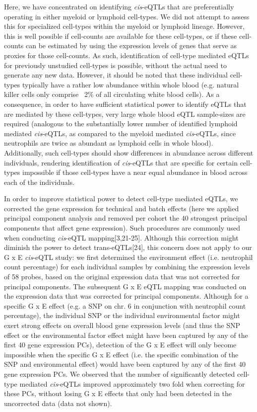   Here, we have concentrated on identifying \emph{cis}-eQTLs that are preferentially operating in either 
  myeloid or lymphoid cell-types. We did not attempt to assess this for specialized cell-types within 
  the myeloid or lymphoid lineage. However, this is well possible if cell-counts are available for 
  these cell-types, or if these cell-counts can be estimated by using the expression levels of genes 
  that serve as proxies for those cell-counts. As such, identification of cell-type mediated eQTLs 
  for previously unstudied cell-types is possible, without the actual need to generate any new data. 
  However, it should be noted that these individual cell-types typically have a rather low abundance 
  within whole blood (e.g. natural killer cells only comprise ~2\% of all circulating white blood 
  cells). As a consequence, in order to have sufficient statistical power to identify eQTLs that are 
  mediated by these cell-types, very large whole blood eQTL sample-sizes are required (analogous to 
  the substantially lower number of identified lymphoid mediated \emph{cis}-eQTLs, as compared to the myeloid 
  mediated \emph{cis}-eQTLs, since neutrophils are twice as abundant as lymphoid cells in whole blood). 
  Additionally, such cell-types should show differences in abundance across different individuals, 
  rendering identification of \emph{cis}-eQTLs that are specific for certain cell-types impossible if those 
  cell-types have a near equal abundance in blood across each of the individuals.

  In order to improve statistical power to detect cell-type mediated eQTLs, we corrected the gene 
  expression for technical and batch effects (here we applied principal component analysis and removed 
  per cohort the 40 strongest principal components that affect gene expression). Such procedures are 
  commonly used when conducting \emph{cis}-eQTL mapping[3,21-25]. Although this correction might diminish the 
  power to detect trans-eQTLs[24], this concern does not apply to our G x E \emph{cis}-eQTL study: we first 
  determined the environment effect (i.e. neutrophil count percentage) for each individual samples by 
  combining the expression levels of 58 probes, based on the original expression data that was not 
  corrected for principal components. The subsequent G x E eQTL mapping was conducted on the expression 
  data that was corrected for principal components. Although for a specific G x E effect (e.g. a SNP 
  on chr. 6 in conjunction with neutrophil count percentage), the individual SNP or the individual 
  environmental factor might exert strong effects on overall blood gene expression levels (and thus 
  the SNP effect or the environmental factor effect might have been captured by any of the first 40 
  gene expression PCs), detection of the G x E effect will only become impossible when the specific 
  G x E effect (i.e. the specific combination of the SNP and environmental effect) would have been 
  captured by any of the first 40 gene expression PCs. We observed that the number of significantly 
  detected cell-type mediated \emph{cis}-eQTLs improved approximately two fold when correcting for these PCs, 
  without losing G x E effects that only had been detected in the uncorrected data (data not shown).

